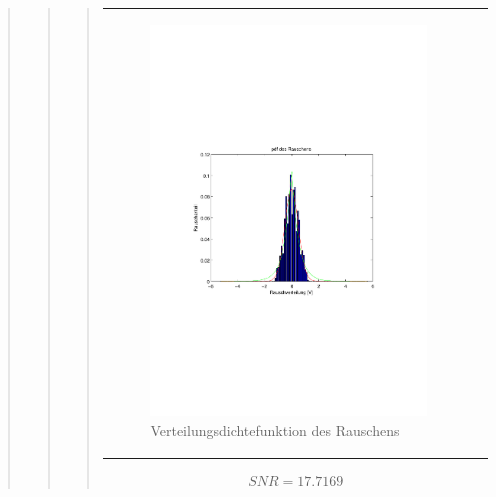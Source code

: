 \begin{quote}
\begin{quote}
\begin{quote}
\begin{center}
\begin{tabular}{ll}
            \begin{minipage}{0.6\textwidth}
                \begin{figure}[H]
                    \includegraphics[scale=0.7, trim = 15mm 80mm 20mm 90mm, clip]{Bilder/hist20}
                    \caption{Verteilungsdichtefunktion des Rauschens}
                    \label{fig:hist20}
                \end{figure}
            
            \end{minipage}
        
        \end{tabular}
        \end{center}
            
            \vspace{2em}
            
            \begin{equation*}
            \begin{split}
                 SNR = 17.7169
            \end{split}
            \end{equation*}
            

\end{quote}
\end{quote}
\end{quote}

